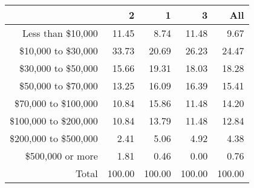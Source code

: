 \documentclass[]{article}
\title{}
\author{}
\begin{document}
\maketitle

\begin{abstract}

\end{abstract}

\section{}

\begin{table}[ht]
	\centering
	\begin{tabular}{rrrrr}
		\hline
		& 2 & 1 & 3 & All \\ 
		\hline
		Less than \$10,000 & 11.45 & 8.74 & 11.48 & 9.67 \\ 
		\$10,000 to \$30,000 & 33.73 & 20.69 & 26.23 & 24.47 \\ 
		\$30,000 to \$50,000 & 15.66 & 19.31 & 18.03 & 18.28 \\ 
		\$50,000 to \$70,000 & 13.25 & 16.09 & 16.39 & 15.41 \\ 
		\$70,000 to \$100,000 & 10.84 & 15.86 & 11.48 & 14.20 \\ 
		\$100,000 to \$200,000 & 10.84 & 13.79 & 11.48 & 12.84 \\ 
		\$200,000 to \$500,000 & 2.41 & 5.06 & 4.92 & 4.38 \\ 
		\$500,000 or more & 1.81 & 0.46 & 0.00 & 0.76 \\ 
		Total & 100.00 & 100.00 & 100.00 & 100.00 \\ 
		\hline
	\end{tabular}
\end{table}
\end{document}
